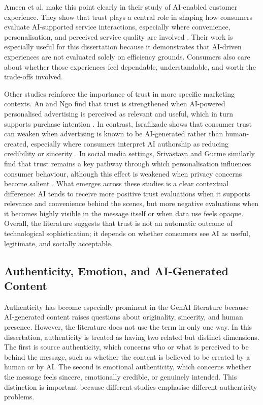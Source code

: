 Ameen et al. make this point clearly in their study of AI-enabled customer experience. They show that trust plays a central role in shaping how consumers evaluate AI-supported service interactions, especially where convenience, personalisation, and perceived service quality are involved \cite{ameen2021customer}. Their work is especially useful for this dissertation because it demonstrates that AI-driven experiences are not evaluated solely on efficiency grounds. Consumers also care about whether those experiences feel dependable, understandable, and worth the trade-offs involved.

Other studies reinforce the importance of trust in more specific marketing contexts. An and Ngo find that trust is strengthened when AI-powered personalised advertising is perceived as relevant and useful, which in turn supports purchase intention \cite{an2025personalized}. In contrast, Israfilzade shows that consumer trust can weaken when advertising is known to be AI-generated rather than human-created, especially where consumers interpret AI authorship as reducing credibility or sincerity \cite{israfilzade2025advertising}. In social media settings, Srivastava and Gurme similarly find that trust remains a key pathway through which personalisation influences consumer behaviour, although this effect is weakened when privacy concerns become salient \cite{srivastava2026social}. What emerges across these studies is a clear contextual difference: AI tends to receive more positive trust evaluations when it supports relevance and convenience behind the scenes, but more negative evaluations when it becomes highly visible in the message itself or when data use feels opaque. Overall, the literature suggests that trust is not an automatic outcome of technological sophistication; it depends on whether consumers see AI as useful, legitimate, and socially acceptable.

\subsection{Authenticity, Emotion, and AI-Generated Content}
Authenticity has become especially prominent in the GenAI literature because AI-generated content raises questions about originality, sincerity, and human presence. However, the literature does not use the term in only one way. In this dissertation, authenticity is treated as having two related but distinct dimensions. The first is source authenticity, which concerns who or what is perceived to be behind the message, such as whether the content is believed to be created by a human or by AI. The second is emotional authenticity, which concerns whether the message feels sincere, emotionally credible, or genuinely intended. This distinction is important because different studies emphasise different authenticity problems.

